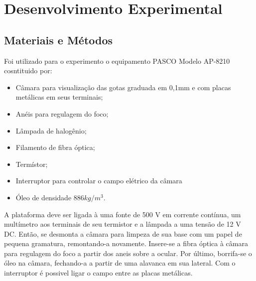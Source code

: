 \section{Desenvolvimento Experimental}
\subsection{Materiais e Métodos}
Foi utilizado para o experimento o equipamento PASCO Modelo AP-8210 cosntituido por: 
\begin{itemize}
	\item Câmara  para visualização das gotas graduada em 0,1mm e com placas metálicas em seus terminais;
	\item Anéis para regulagem do foco;
	\item Lâmpada de halogênio;
	\item Filamento de fibra óptica;
	\item Termístor;
	\item Interruptor para controlar o campo elétrico da câmara
	\item Óleo de densidade $886 kg/m^3$.
\end{itemize}

A plataforma deve ser ligada à uma fonte de 500 V em corrente contínua, um multímetro aos terminais de seu termistor e a lâmpada a uma tensão de 12 V DC. Então, se desmonta a câmara para limpeza de sua base com um papel de pequena gramatura, remontando-a novamente. Insere-se a fibra óptica à câmara para regulagem do foco a partir dos aneis sobre a ocular. Por último, borrifa-se o óleo na câmara, fechando-a a partir de uma alavanca em sua lateral. Com o interruptor é possivel ligar o campo entre as placas metálicas.      
